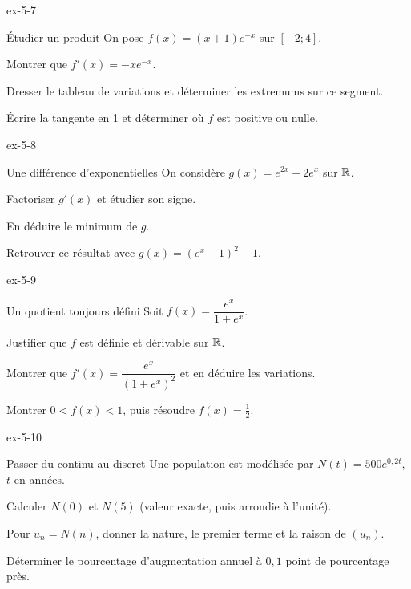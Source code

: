 \begin{blocLivre}{ex-5-7}
\begin{exercice}[2]{Étudier un produit}
On pose $f(x)=(x+1)e^{-x}$ sur $[-2;4]$.
\begin{questions}\item Montrer que $f'(x)=-xe^{-x}$.
\item Dresser le tableau de variations et déterminer les extremums sur ce segment.
\item Écrire la tangente en 1 et déterminer où $f$ est positive ou nulle.
\end{questions}
\end{exercice}
\end{blocLivre}
\begin{blocLivre}{ex-5-8}
\begin{exercice}[2]{Une différence d'exponentielles}
On considère $g(x)=e^{2x}-2e^x$ sur $\mathbb{R}$.
\begin{questions}\item Factoriser $g'(x)$ et étudier son signe.
\item En déduire le minimum de $g$.
\item Retrouver ce résultat avec $g(x)=(e^x-1)^2-1$.
\end{questions}
\end{exercice}
\end{blocLivre}
\begin{blocLivre}{ex-5-9}
\begin{exercice}[2]{Un quotient toujours défini}
Soit $f(x)=\dfrac{e^x}{1+e^x}$.
\begin{questions}\item Justifier que $f$ est définie et dérivable sur $\mathbb{R}$.
\item Montrer que $f'(x)=\dfrac{e^x}{(1+e^x)^2}$ et en déduire les variations.
\item Montrer $0<f(x)<1$, puis résoudre $f(x)=\frac12$.
\end{questions}
\end{exercice}
\end{blocLivre}
\begin{blocLivre}{ex-5-10}
\begin{exercice}[2]{Passer du continu au discret}
Une population est modélisée par $N(t)=500e^{0{,}2t}$, $t$ en années.
\begin{questions}\item Calculer $N(0)$ et $N(5)$ (valeur exacte, puis arrondie à l'unité).
\item Pour $u_n=N(n)$, donner la nature, le premier terme et la raison de $(u_n)$.
\item Déterminer le pourcentage d'augmentation annuel à $0{,}1$ point de pourcentage près.
\end{questions}
\end{exercice}
\end{blocLivre}
